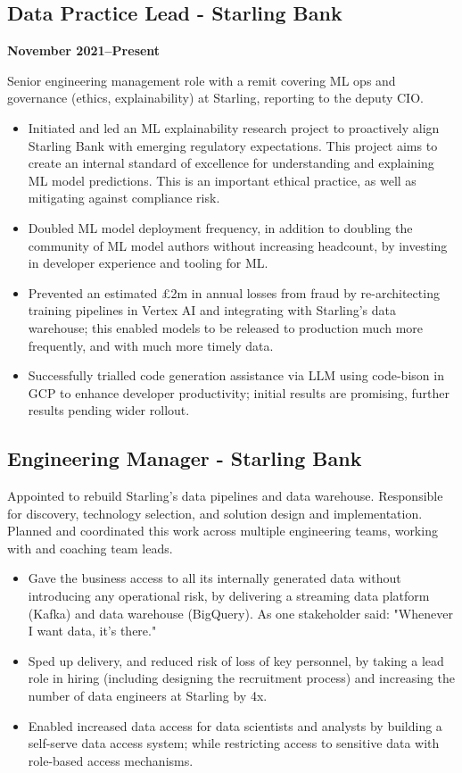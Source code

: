 \documentclass[a4paper]{scrartcl}
\begin{document}
\subsection*{Data Practice Lead - Starling Bank}
\textbf{November 2021--Present}

Senior engineering management role with a remit covering ML ops and governance (ethics,
explainability) at Starling, reporting to the deputy CIO.
\begin{itemize}
	\item Initiated and led an ML explainability research project to proactively align Starling Bank with emerging regulatory expectations. This project aims to create an internal standard of excellence for understanding and explaining ML model predictions. This is an important ethical practice, as well as mitigating against compliance risk.
	\item Doubled ML model deployment frequency, in addition to doubling the community of ML model authors without increasing headcount, by investing in developer experience and tooling for ML.
	\item Prevented an estimated £2m in annual losses from fraud by re-architecting training pipelines in Vertex AI and integrating with Starling's data warehouse; this enabled models to be released to production much more frequently, and with much more timely data.
	\item Successfully trialled code generation assistance via LLM using code-bison in GCP to enhance developer productivity; initial results are promising, further results pending wider rollout.
\end{itemize}

\subsection*{Engineering Manager - Starling Bank}

Appointed to rebuild Starling's data pipelines and data warehouse. Responsible for discovery, technology selection, and solution design and implementation. Planned and coordinated this work across multiple engineering teams, working with and coaching team leads.
\begin{itemize}
	\item Gave the business access to all its internally generated data without introducing any operational risk, by delivering a streaming data platform (Kafka) and data warehouse (BigQuery). As one stakeholder said: "Whenever I want data, it's there."
	\item Sped up delivery, and reduced risk of loss of key personnel, by taking a lead role in hiring (including designing the recruitment process) and increasing the number of data engineers at Starling by 4x.
	\item Enabled increased data access for data scientists and analysts by building a self-serve data access system; while restricting access to sensitive data with role-based access mechanisms.
\end{itemize}
\end{document}
